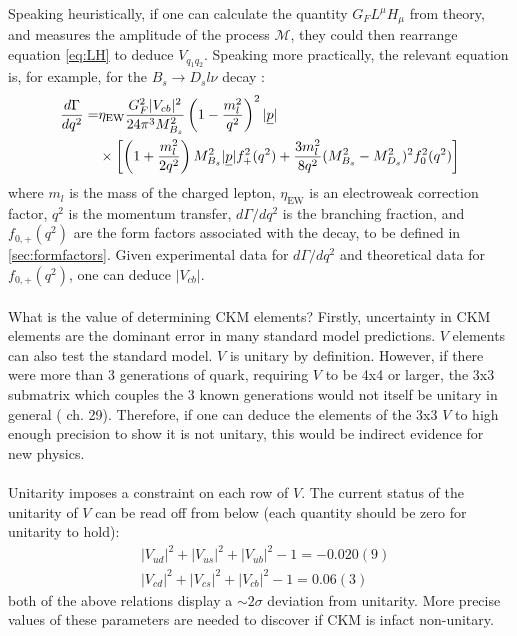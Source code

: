 \documentclass[a4paper,10pt]{article}
\numberwithin{equation}{section}
\begin{document}
Speaking heuristically, if one can calculate the quantity $G_F L^{\mu} H_{\mu}$ from theory, and measures the amplitude of the process $\mathcal{M}$, they could then rearrange equation \eqref{eq:LH} to deduce $V_{q_1q_2}$. Speaking more practically, the relevant equation is, for example, for the $B_s \to D_s l\nu$ decay \cite{Na:2015kha}:
\begin{align}
	{d\Gamma \over dq^2} =& \eta_{\text{EW}} {G^2_F |V_{cb}|^2 \over 24\pi^3 M_{B_s}^2} \left( 1 - {m_l^2\over q^2}\right)^2 |\underline{p}| \\
	&\times \left[ \left(1+{m_l^2\over 2q^2}\right) M_{B_s}^2 |\underline{p}| f^2_+(q^2) + {3m_l^2\over 8q^2}(M_{B_s}^2 - M_{D_s}^2)^2 f_0^2(q^2)\right]
\end{align}
where $m_l$ is the mass of the charged lepton, $\eta_{\text{EW}}$ is an electroweak correction factor, $q^2$ is the momentum transfer, ${d\Gamma/dq^2}$ is the branching fraction, and $f_{0,+}(q^2)$ are the form factors associated with the decay, to be defined in \ref{sec:formfactors}. Given experimental data for ${d\Gamma/dq^2}$ and theoretical data for $f_{0,+}(q^2)$, one can deduce $|V_{cb}|$.
\\ \\
What is the value of determining CKM elements? Firstly, uncertainty in CKM elements are the dominant error in many standard model predictions. $V$ elements can also test the standard model. $V$ is unitary by definition. However, if there were more than 3 generations of quark, requiring $V$ to be 4x4 or larger, the 3x3 submatrix which couples the 3 known generations
would not itself be unitary in general (\cite{Schwartz:2013pla} ch. 29). Therefore, if one can deduce the elements of the 3x3 $V$ to high enough precision to show it is not unitary, this would be indirect evidence for new physics. 
\\ \\
Unitarity imposes a constraint on each row of $V$. The current status of the unitarity of $V$ can be read off from below (each quantity should be zero for unitarity to hold)\cite{Aoki:2016frl}:
\begin{align}
	\nonumber
	&|V_{ud}|^2 + |V_{us}|^2 + |V_{ub}|^2 - 1 = -0.020(9) \\ 
	&|V_{cd}|^2 + |V_{cs}|^2 + |V_{cb}|^2 - 1 = 0.06(3)
\end{align}
both of the above relations display a $\sim2\sigma$ deviation from unitarity. More precise values of these parameters are needed to discover if CKM is infact non-unitary.
\\ \\
\end{document}

